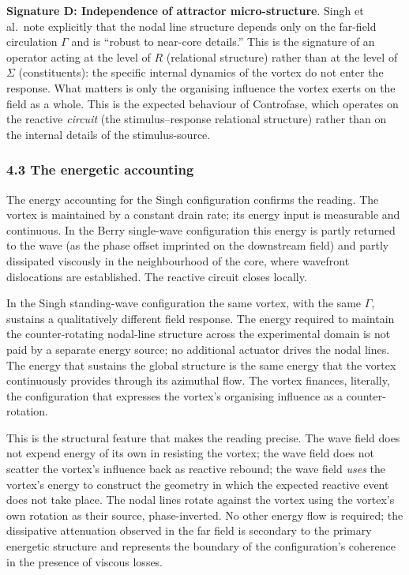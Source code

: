 \documentclass[
  11pt,
  a4paper,
]{article}
\begin{document}
\textbf{Signature D: Independence of attractor micro-structure}. Singh
et al.~note explicitly that the nodal line structure depends only on the
far-field circulation \(\Gamma\) and is ``robust to near-core details.''
This is the signature of an operator acting at the level of \(R\)
(relational structure) rather than at the level of \(\Sigma\)
(constituents): the specific internal dynamics of the vortex do not
enter the response. What matters is only the organising influence the
vortex exerts on the field as a whole. This is the expected behaviour of
Controfase, which operates on the reactive \emph{circuit} (the
stimulus--response relational structure) rather than on the internal
details of the stimulus-source.

\subsubsection{4.3 The energetic
accounting}\label{the-energetic-accounting-1}

The energy accounting for the Singh configuration confirms the reading.
The vortex is maintained by a constant drain rate; its energy input is
measurable and continuous. In the Berry single-wave configuration this
energy is partly returned to the wave (as the phase offset imprinted on
the downstream field) and partly dissipated viscously in the
neighbourhood of the core, where wavefront dislocations are established.
The reactive circuit closes locally.

In the Singh standing-wave configuration the same vortex, with the same
\(\Gamma\), sustains a qualitatively different field response. The
energy required to maintain the counter-rotating nodal-line structure
across the experimental domain is not paid by a separate energy source;
no additional actuator drives the nodal lines. The energy that sustains
the global structure is the same energy that the vortex continuously
provides through its azimuthal flow. The vortex finances, literally, the
configuration that expresses the vortex's organising influence as a
counter-rotation.

This is the structural feature that makes the reading precise. The wave
field does not expend energy of its own in resisting the vortex; the
wave field does not scatter the vortex's influence back as reactive
rebound; the wave field \emph{uses} the vortex's energy to construct the
geometry in which the expected reactive event does not take place. The
nodal lines rotate against the vortex using the vortex's own rotation as
their source, phase-inverted. No other energy flow is required; the
dissipative attenuation observed in the far field is secondary to the
primary energetic structure and represents the boundary of the
configuration's coherence in the presence of viscous losses.
\end{document}
